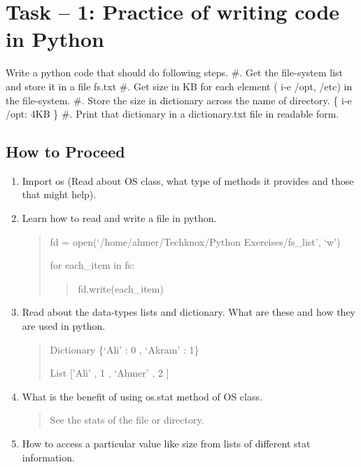 \documentclass[letterpaper,10pt,english]{sphinxmanual}
\begin{document}
\section{Task – 1: Practice of writing code in Python}
\label{week-08:task-1-practice-of-writing-code-in-python}
Write a python code that should do following steps.
\#. Get the file-system list and store it in a file fs.txt
\#. Get size in KB for each element ( i-e /opt, /etc) in the file-system.
\#. Store the size in dictionary across the name of directory. \{ i-e /opt: 4KB \}
\#. Print that dictionary in a dictionary.txt file in readable form.


\subsection{How to Proceed}
\label{week-08:how-to-proceed}\begin{enumerate}
\item {} 
Import os (Read about OS class, what type of methods it provides and those that might help).

\item {} 
Learn how to read and write a file in python.
\begin{quote}

fd = open(`/home/ahmer/Techknox/Python Exercises/fs\_list', `w')

for each\_item in fs:
\begin{quote}

fd.write(each\_item)
\end{quote}
\end{quote}

\item {} 
Read about the data-types lists and dictionary. What are these and how they are used in python.
\begin{quote}

Dictionary \{`Ali' : 0 , `Akram' : 1\}

List {[}'Ali' , 1 , `Ahmer' , 2 {]}
\end{quote}

\item {} 
What is the benefit of using os.stat method of OS class.
\begin{quote}

See the stats of the file or directory.
\end{quote}

\item {} 
How to access a particular value like size from lists of different stat information.
\begin{quote}


\end{quote}
\end{enumerate}
\end{document}
